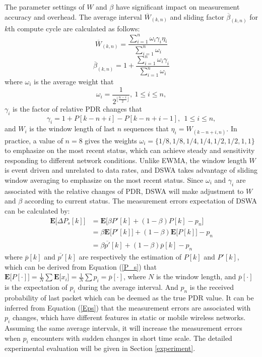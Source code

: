 \documentclass[journal,onecolumn,12pt]{IEEEtran}
\begin{document}
The parameter settings of $W$ and $\beta$ have significant impact on measurement accuracy and overhead. The average interval $\overline{W}_{(k,n)}$ and sliding factor $\overline{\beta}_{(k,n)}$ for $k$th compute cycle are calculated as follows:
\begin{equation}
  \overline{W}_{(k,n)} = \frac{\sum_{i=1}^n{\omega_i \gamma_i} \eta_{i}}{\sum_{i=1}^n{\omega_i}}
\label{W_s}
\end{equation}
\begin{equation}
  \overline{\beta}_{(k,n)} = 1 + \frac{\sum_{i=1}^n{\omega_i \gamma_i}}{\sum_{i=1}^n{\omega_i}}
\label{beta}
\end{equation}
where $\omega_i$ is the average weight that
\begin{equation}
  \omega_i = \frac{1}{2^{\lfloor\frac{n-i}{2}\rfloor}},~1\leq i \leq n,
\end{equation}
$\gamma_i$ is the factor of relative PDR changes that
\begin{equation}
  \gamma_i = 1 + P[k-n+i] - P[k-n+i-1],~~ 1 \leq i \leq n,
\label{gamma_i}
\end{equation}
and $W_i$ is the window length of last $n$ sequences that $\eta_i=W_{(k-n+i,n)}$. In practice, a value of $n=8$ gives the weights $\omega_i=\{1/8,1/8,1/4,1/4,1/2,1/2,1,1\}$ to emphasize on the most recent status, which can achieve steady and sensitivity responding to different network conditions. Unlike EWMA, the window length $W$ is event driven and unrelated to data rates, and DSWA takes advantage of sliding window averaging to emphasize on the most recent status. Since $\omega_i$ and $\gamma_i$ are associated with the relative changes of PDR, DSWA will make adjustment to $W$ and $\beta$ according to current status. The measurement errors expectation of DSWA can be calculated by:
\begin{equation}
\begin{split}
 \textbf{E[}\Delta P_s[k]\textbf{]}&=\textbf{E[}\beta P'[k]+(1-\beta)P[k]-p_{n}\textbf{]}\\
                                       &=\beta\textbf{E[}P'[k]\textbf{]}+(1-\beta)\textbf{E[}P[k]\textbf{]}-p_{n}\\
                                       &=\beta\overline{p'}[k]+(1-\beta)\overline{p}[k]-p_{n}
\end{split}
\label{Eps}
\end{equation}
where $\overline{p}[k]$ and $\overline{p'}[k]$ are respectively the estimation of $P[k]$ and $P'[k]$, which can be derived from Equation (\ref{P_s}) that $\textbf{E[}P[\cdot]\textbf{]}=\frac{1}{N}\sum\textbf{E[}x_i\textbf{]}=\frac{1}{N}\sum{p_i}=\overline{p}[\cdot]$, where $N$ is the window length, and $\overline{p}[\cdot]$ is the expectation of $p_i$ during the average interval. And $p_n$ is the received probability of last packet which can be deemed as the true PDR value. It can be inferred from Equation (\ref{Eps}) that the measurement errors are associated with $p_i$ changes, which have different features in static or mobile wireless networks. Assuming the same average intervals, it will increase the measurement errors when $p_i$ encounters with sudden changes in short time scale. The detailed experimental evaluation will be given in Section \ref{experiment}.
\end{document}
